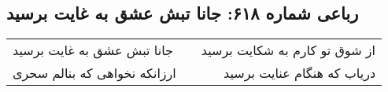 \begin{center}
\section*{رباعی شماره ۶۱۸: جانا تبش عشق به غایت برسید}
\label{sec:0618}
\begin{longtable}{l p{0.5cm} r}
جانا تبش عشق به غایت برسید
&&
از شوق تو کارم به شکایت برسید
\\
ارزانکه نخواهی که بنالم سحری
&&
دریاب که هنگام عنایت برسید
\\
\end{longtable}
\end{center}
